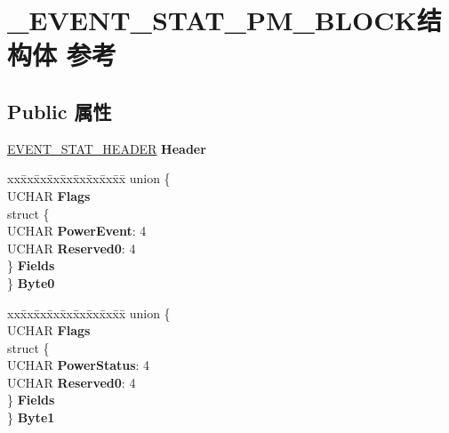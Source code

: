\hypertarget{struct___e_v_e_n_t___s_t_a_t___p_m___b_l_o_c_k}{}\section{\+\_\+\+E\+V\+E\+N\+T\+\_\+\+S\+T\+A\+T\+\_\+\+P\+M\+\_\+\+B\+L\+O\+C\+K结构体 参考}
\label{struct___e_v_e_n_t___s_t_a_t___p_m___b_l_o_c_k}
\subsection*{Public 属性}
\begin{DoxyCompactItemize}
\item 
\mbox{\label{struct___e_v_e_n_t___s_t_a_t___p_m___b_l_o_c_k_ab57866c0242e9db68a1e680452931185}} 
\hyperlink{struct___e_v_e_n_t___s_t_a_t___h_e_a_d_e_r}{E\+V\+E\+N\+T\+\_\+\+S\+T\+A\+T\+\_\+\+H\+E\+A\+D\+ER} {\bfseries Header}
\item 
\mbox{\label{struct___e_v_e_n_t___s_t_a_t___p_m___b_l_o_c_k_ab7fd8cf8ffb5238fa17b973e6cb276c3}} 
\begin{tabbing}
xx\=xx\=xx\=xx\=xx\=xx\=xx\=xx\=xx\=\kill
union \{\\
\>UCHAR {\bfseries Flags}\\
\>struct \{\\
\>\>UCHAR {\bfseries PowerEvent}: 4\\
\>\>UCHAR {\bfseries Reserved0}: 4\\
\>\} {\bfseries Fields}\\
\} {\bfseries Byte0}\\

\end{tabbing}\item 
\mbox{\label{struct___e_v_e_n_t___s_t_a_t___p_m___b_l_o_c_k_a270859e794760b4fdf0dae4c94b78011}} 
\begin{tabbing}
xx\=xx\=xx\=xx\=xx\=xx\=xx\=xx\=xx\=\kill
union \{\\
\>UCHAR {\bfseries Flags}\\
\>struct \{\\
\>\>UCHAR {\bfseries PowerStatus}: 4\\
\>\>UCHAR {\bfseries Reserved0}: 4\\
\>\} {\bfseries Fields}\\
\} {\bfseries Byte1}\\


\end{tabbing}
\end{DoxyCompactItemize}
